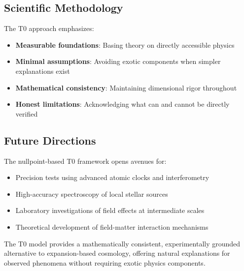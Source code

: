 \documentclass[12pt,a4paper]{article}
\begin{document}
	\subsection{Scientific Methodology}
	\label{subsec:scientific_methodology}
	
	The T0 approach emphasizes:
	\begin{itemize}
		\item \textbf{Measurable foundations}: Basing theory on directly accessible physics
		\item \textbf{Minimal assumptions}: Avoiding exotic components when simpler explanations exist
		\item \textbf{Mathematical consistency}: Maintaining dimensional rigor throughout
		\item \textbf{Honest limitations}: Acknowledging what can and cannot be directly verified
	\end{itemize}
	
	\subsection{Future Directions}
	\label{subsec:future_directions}
	
	The nullpoint-based T0 framework opens avenues for:
	\begin{itemize}
		\item Precision tests using advanced atomic clocks and interferometry
		\item High-accuracy spectroscopy of local stellar sources
		\item Laboratory investigations of field effects at intermediate scales
		\item Theoretical development of field-matter interaction mechanisms
	\end{itemize}
	
	The T0 model provides a mathematically consistent, experimentally grounded alternative to expansion-based cosmology, offering natural explanations for observed phenomena without requiring exotic physics components.
	
\end{document}
